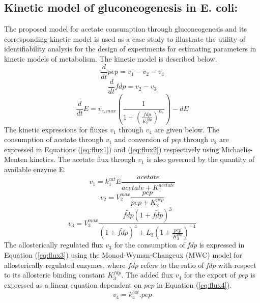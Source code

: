 \documentclass[10pt]{article}
\begin{document}
\subsection{Kinetic model of gluconeogenesis in E. coli:}\label{sec:small-model}
The proposed model for acetate consumption through gluconeogenesis and its corresponding kinetic model is used as a case study to illustrate the utility of identifiability analysis for the design of experiments for estimating parameters in kinetic models of metabolism. The kinetic model is described below.
\begin{equation}\label{eq:ode1}
\frac{d}{dt}pep=v_1-v_2-v_4
\end{equation}
\begin{equation}\label{eq:ode2}
\frac{d}{dt}fdp=v_2-v_3
\end{equation}
\begin{equation}\label{eq:ode3}
\frac{d}{dt}E=v_{e,max}\left(\frac{1}{1+\left(\frac{fdp}{K_{e}^{fdp}}\right)^{n_e}}\right) - d E
\end{equation}
The kinetic expressions for fluxes $v_1$ through $v_4$ are given below. The consumption of acetate through $v_1$ and conversion of \textit{pep} through $v_2$ are expressed in Equations (\ref{eq:flux1}) and (\ref{eq:flux2}) respectively using Michaelis-Menten kinetics. The acetate flux through $v_1$ is also governed by the quantity of available enzyme E. 
\begin{equation}\label{eq:flux1}
v_1 = k_{1}^{cat}E\frac{acetate}{acetate+K_{1}^{acetate}}
\end{equation}	
\begin{equation}\label{eq:flux2}
v_2 = V_{2}^{max}\frac{pep}{pep+K_{2}^{pep}}
\end{equation}
\begin{equation}\label{eq:flux3}
v_3 = V_{3}^{max}\frac{\tilde{fdp}\left(1+\tilde{fdp}\right)^3}{\left(1+\tilde{fdp}\right)^4+L_3\left(1+\frac{pep}{K_{3}^{pep}}\right)^{-4}}
\end{equation}
The allosterically regulated flux $v_3$ for the consumption of \textit{fdp} is expressed in Equation (\ref{eq:flux3}) using the Monod-Wyman-Changeux (MWC) model for allosterically regulated enzymes, where $\tilde{fdp}$ refers to the ratio of \textit{fdp} with respect to its allosteric binding constant $K_{3}^{fdp}$. The added flux $v_4$ for the export of \textit{pep} is expressed as a linear equation dependent on $pep$ in Equation (\ref{eq:flux4}).
\begin{equation}\label{eq:flux4}
v_4 = k_{4}^{cat}.pep
\end{equation}
\end{document}
